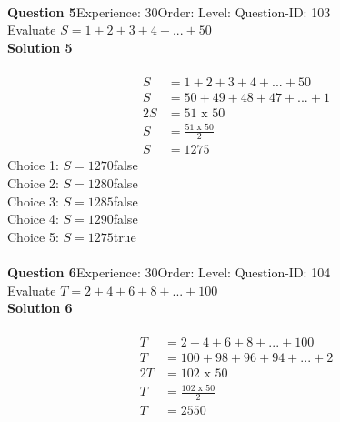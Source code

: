 \documentclass{article}
\begin{document}
\\[4pt]
\noindent\textbf{Question 5}\hspace{20pt}Experience: 30\hspace{20pt}Order: \hspace{20pt}Level: \hspace{20pt}Question-ID: 103\\[2pt]
Evaluate $S=1+2+3+4+...+50$\\[4pt]
\noindent\textbf{Solution 5}\\[2pt]
\\[-35pt]\begin{align*}
S&=1+2+3+4+...+50\\[2pt]
S&=50+49+48+47+...+1\\[2pt]
2S&=51\,\,\text{x}\,\,50\\[2pt]
S&=\displaystyle\frac{51\,\,\text{x}\,\,50}{2}\\[2pt]
S&=1275
\end{align*}
Choice 1: \hspace{20pt}$S=1270$\hspace{20pt}false\\
Choice 2: \hspace{20pt}$S=1280$\hspace{20pt}false\\
Choice 3: \hspace{20pt}$S=1285$\hspace{20pt}false\\
Choice 4: \hspace{20pt}$S=1290$\hspace{20pt}false\\
Choice 5: \hspace{20pt}$S=1275$\hspace{20pt}true\\
\\[4pt]
\noindent\textbf{Question 6}\hspace{20pt}Experience: 30\hspace{20pt}Order: \hspace{20pt}Level: \hspace{20pt}Question-ID: 104\\[2pt]
Evaluate $T=2+4+6+8+...+100$\\[4pt]
\noindent\textbf{Solution 6}\\[2pt]
\\[-35pt]\begin{align*}
T&=2+4+6+8+...+100\\[2pt]
T&=100+98+96+94+...+2\\[2pt]
2T&=102\,\,\text{x}\,\,50\\[2pt]
T&=\displaystyle\frac{102\,\,\text{x}\,\,50}{2}\\[2pt]
T&=2550
\end{align*}
\end{document}
